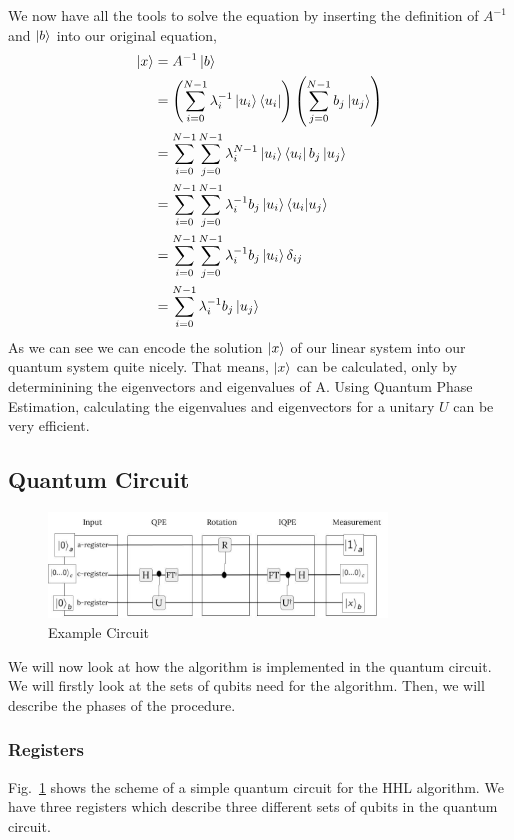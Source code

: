 We now have all the tools to solve the equation by inserting the definition of $A^{-1}$ and $\ket b$ into our original equation,
\begin{align*}
\ket{x} &= A^{-1} \ket{b}\\
&=\left(\sum_{i=0}^{N-1} \lambda_i^{-1} \ket{u_i}\bra{u_i} \right) \left(\sum_{j=0}^{N-1} b_j\ket{u_j} \right) \\
&=\sum_{i=0}^{N-1} \sum_{j=0}^{N-1} \lambda_i^{N-1} \ket{u_i}\bra{u_i} b_j\ket{u_j}\\
&=\sum_{i=0}^{N-1} \sum_{j=0}^{N-1} \lambda_i^{-1} b_j\ket{u_i}\braket{u_i| u_j}\\
&=\sum_{i=0}^{N-1} \sum_{j=0}^{N-1} \lambda_i^{-1} b_j\ket{u_i}\delta_{ij}\\
&=\sum_{i=0}^{N-1} \lambda_i^{-1} b_j\ket{u_j}\\
\end{align*}
As we can see we can encode the solution $\ket x$ of our linear system into our quantum system quite nicely.
That means, $\ket x$ can be calculated, only by determinining the eigenvectors and eigenvalues of A. 
Using Quantum Phase Estimation, calculating the eigenvalues and eigenvectors for a unitary $U$ can be very efficient.



\subsection{Quantum Circuit}

\begin{figure}
    \centering
    \includegraphics[width=9.0cm]{img/example_circuit_cropped.png}
    \caption{Example Circuit}
    \label{ex_circ}
\end{figure}


We will now look at how the algorithm is implemented in the quantum circuit. 
We will firstly look at the sets of qubits need for the algorithm. 
Then, we will describe the phases of the procedure.

\subsubsection{Registers}
Fig.~\ref{ex_circ} shows the scheme of a simple quantum circuit for the HHL algorithm.
We have three registers which describe three different sets of qubits in the quantum circuit.

